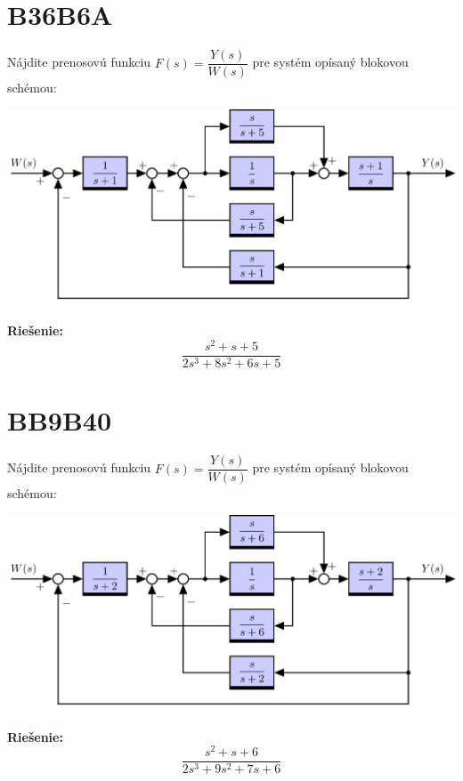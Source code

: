 \documentclass[a4paper, 12pt]{article}
\newenvironment{task}{}{}
\newenvironment{solution}{\noindent\textbf{Riešenie:}}{}
\begin{document}
\section*{B36B6A}
\begin{task}
    Nájdite prenosovú funkciu $F(s)=\dfrac{Y(s)}{W(s)}$ pre systém opísaný blokovou schémou:

    \includegraphics{../images/blokovka02_00002.jpg}
\end{task} 

\begin{solution}
    \begin{equation*}
        \dfrac{s^2+s+5}{2s^3+8s^2+6s+5}
    \end{equation*}
\end{solution}

\section*{BB9B40}
\begin{task}
    Nájdite prenosovú funkciu $F(s)=\dfrac{Y(s)}{W(s)}$ pre systém opísaný blokovou schémou:

    \includegraphics{../images/blokovka02_00003.jpg}
\end{task} 

\begin{solution}
    \begin{equation*}
        \dfrac{s^2+s+6}{2s^3+9s^2+7s+6}
    \end{equation*}
\end{solution}
\end{document}

